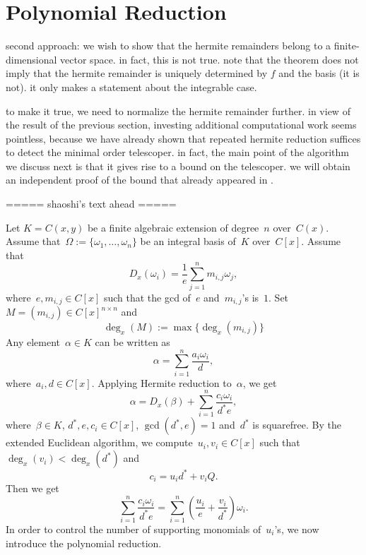 \documentclass{sig-alternate}
\newtheorem{lemma}[theorem]{Lemma}
\newcommand{\red}{\color{red}}
\begin{document}
\section{Polynomial Reduction}\label{sec:polynomial}

second approach: we wish to show that the hermite remainders belong to a finite-dimensional
vector space. in fact, this is not true.
note that the theorem does not imply that the hermite remainder is uniquely determined by
$f$ and the basis (it is not). it only makes a statement about the integrable case.

to make it true, we need to normalize the hermite remainder further. in view of the result
of the previous section, investing additional computational work seems pointless, because we have
already shown that repeated hermite reduction suffices to detect the minimal order telescoper.
in fact, the main point of the algorithm we discuss next is that it gives rise to a bound on
the telescoper. we will obtain an independent proof of the bound that already appeared in \cite{chen14a}.

===== shaoshi's text ahead =====

Let $K= C(x, y)$ be a finite algebraic extension of degree~$n$ over~$C(x)$.
Assume that~$\Omega:=\{\omega_1, \ldots, \omega_n\}$ be an integral basis of~$K$
over~$C[x]$.  Assume that
\[D_x(\omega_i) = \frac{1}{e}\sum_{j=1}^n m_{i, j}\omega_j,\]
where~$e, m_{i, j}\in C[x]$ such that the gcd of~$e$ and~$m_{i,j}$'s is~$1$.
Set~$M=(m_{i, j})\in C[x]^{n\times n}$
and
\[\deg_x(M):= \max\{\deg_x(m_{i, j})\}\]
Any element~$\alpha\in K$ can be written as
\[\alpha = \sum_{i=1}^n \frac{a_i\omega_i}{d},\]
where~$a_i, d\in C[x]$. Applying Hermite reduction to~$\alpha$, we get
\[\alpha = D_x(\beta) + \sum_{i=1}^n \frac{c_i\omega_i}{d^*e},\]
where~$\beta\in K$, $d^*, e, c_i\in C[x]$, $\gcd(d^*, e)=1$ and~$d^*$ is squarefree.
By the extended Euclidean algorithm, we compute~$u_i, v_i\in C[x]$ such that
$\deg_x(v_i) < \deg_x(d^*)$ and
\[c_i = u_i d^* + v_i Q.\]
Then we get
\[ \sum_{i=1}^n \frac{c_i\omega_i}{d^*e} =  \sum_{i=1}^n \left(\frac{u_i}{e} + \frac{v_i}{d^*}\right)\omega_i.\]
In order to control the number of supporting monomials of~$u_i$'s, we now introduce the polynomial reduction.
\end{document}

